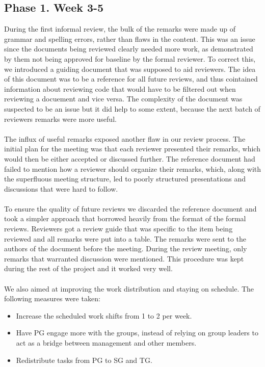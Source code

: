 \documentclass{article}
\begin{document}
    \subsection{Phase 1. Week 3-5} 
        During the first informal review, the bulk of the remarks were made up of grammar and spelling errors, rather
        than flaws in the  content. This was an issue since the documents being reviewed clearly needed more work, as demonstrated
        by them not being approved for baseline by the formal reviewer. To correct this, we introduced a guiding document that was
        supposed to aid reviewers. The idea of this document was to be a reference for all future reviews, and 
        thus cointained information about reviewing code that would have to be filtered out when 
        reviewing a docuement and vice versa. The complexity of the document was suspected to be an issue but it did help to some extent, because the next batch of reviewers remarks were more useful.
        \\ \\
        The influx of useful remarks exposed another flaw in our review process. The initial plan for the meeting was
        that each reviewer presented their remarks, which would then be either accepted or discussed further. 
        The reference document had failed to mention how a reviewer should organize their
        remarks, which, along with the superfluous meeting structure, led to poorly structured presentations and discussions that were hard to follow.
        \\ \\
        To ensure the quality of future reviews we discarded the reference document and took a simpler
        approach that borrowed heavily from the format of the formal reviews. Reviewers got a review 
        guide that was specific to the item being reviewed and all remarks were put into a
        table. The remarks were sent to the authors of the document before the meeting. During the review meeting,
        only remarks that warranted discussion were mentioned. This procedure was kept during the rest of the project and it worked very well.
        \\ \\
        We also aimed at improving the work distribution and staying on schedule. The following measures were taken:
        \begin{itemize}
            \item Increase the scheduled work shifts from 1 to 2 per week.
            \item Have PG engage more with the groups, instead of relying on group leaders to act as a 
            bridge between management and other members. 
            \item Redistribute tasks from PG to SG and TG. 
        \end{itemize}
        
\end{document}
